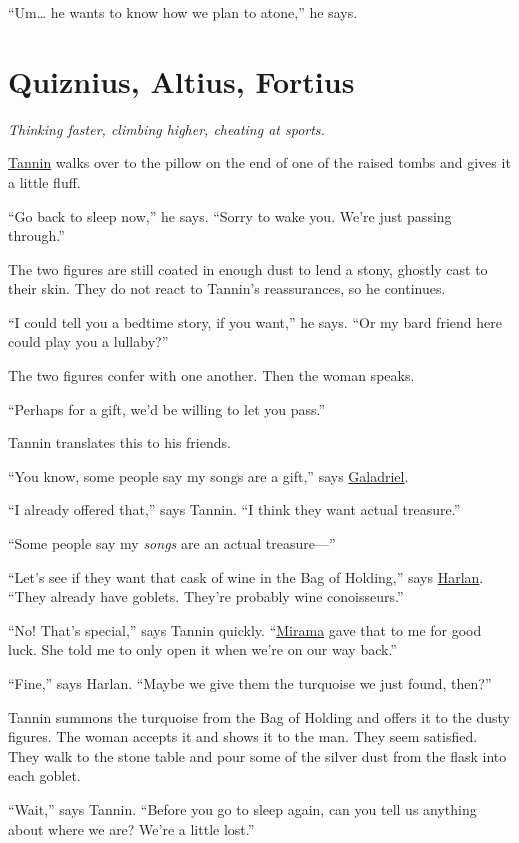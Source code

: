 \documentclass[smalldemyvopaper,11pt,twoside,onecolumn,openright,extrafontsizes]{memoir}
\newcommand{\chapdesc}[1]{
    \begin{flushright}
    \emph{{#1}}
    \end{flushright}
    \vspace{26pt}
}
\begin{document}
``Um\ldots{} he wants to know how we plan to atone,'' he says.


\chapter{Quiznius, Altius, Fortius}
\chapdesc{Thinking faster, climbing higher, cheating at sports.}

\href{/characters/tannin/}{Tannin} walks over to the pillow on the end
of one of the raised tombs and gives it a little fluff.

``Go back to sleep now,'' he says. ``Sorry to wake you. We're just
passing through.''

The two figures are still coated in enough dust to lend a stony, ghostly
cast to their skin. They do not react to Tannin's reassurances, so he
continues.

``I could tell you a bedtime story, if you want,'' he says. ``Or my bard
friend here could play you a lullaby?''

The two figures confer with one another. Then the woman speaks.

``Perhaps for a gift, we'd be willing to let you pass.''

Tannin translates this to his friends.

``You know, some people say my songs are a gift,'' says
\href{/characters/galadriel/}{Galadriel}.

``I already offered that,'' says Tannin. ``I think they want actual
treasure.''

``Some people say my \emph{songs} are an actual treasure---''

``Let's see if they want that cask of wine in the Bag of Holding,'' says
\href{/characters/harlan/}{Harlan}. ``They already have goblets. They're
probably wine conoisseurs.''

``No! That's special,'' says Tannin quickly.
``\href{/characters/mirama/}{Mirama} gave that to me for good luck. She
told me to only open it when we're on our way back.''

``Fine,'' says Harlan. ``Maybe we give them the turquoise we just found,
then?''

Tannin summons the turquoise from the Bag of Holding and offers it to
the dusty figures. The woman accepts it and shows it to the man. They
seem satisfied. They walk to the stone table and pour some of the silver
dust from the flask into each goblet.

``Wait,'' says Tannin. ``Before you go to sleep again, can you tell us
anything about where we are? We're a little lost.''
\end{document}
